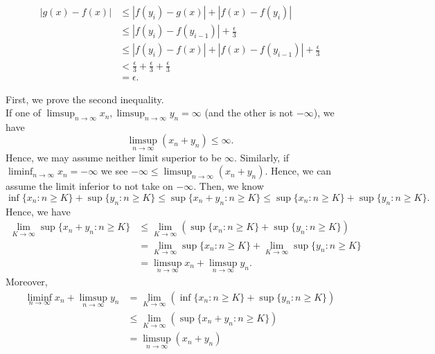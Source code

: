 \documentclass[a4paper]{article}
\begin{document}
\begin{solution}[18]
\begin{align*}
		\left| g\left( x \right) - f\left( x \right)  \right| &\le \left| f\left( y_{i} \right) - g\left( x \right)  \right|  + \left| f\left( x \right) - f\left( y_{i} \right)  \right| \\
								      &\le \left| f\left( y_{i} \right) - f\left( y_{i-1} \right)  \right|  + \frac{\epsilon}{3}\\
								      &\le \left| f\left( y_{i} \right) - f\left( x \right)  \right|  + \left| f\left( x \right) - f\left( y_{i-1} \right)  \right|  + \frac{\epsilon}{3}\\
								      &< \frac{\epsilon}{3} + \frac{\epsilon}{3} + \frac{\epsilon}{3}\\
								      &= \epsilon
	.\end{align*}
\end{solution}
\newpage
\begin{solution}[19]
	First, we prove the second inequality.	\\If one of \(\limsup_{n \to \infty} x_{n}, \limsup_{n \to \infty} y_{n} = \infty\) (and the other is not \(-\infty\)), we have \[
		\limsup_{n \to \infty} \left( x_{n} + y_{n} \right)  \le \infty
	.\]
	Hence, we may assume neither limit superior to be \(\infty\). Similarly, if \(\liminf_{n \to \infty} x_{n} = -\infty\) we see \(-\infty \le \limsup_{n \to \infty} \left( x_{n} + y_{n} \right) \). Hence, we can assume the limit inferior to not take on \(-\infty\).  Then, we know
	\[
	\inf \{ x_{n} : n \ge K\} +\sup \{ y_{n} : n\ge K \} \le \sup \{ x_{n} + y_{n} : n \ge K \} \le \sup \{ x_{n} : n\ge K \} + \sup \{ y_{n} : n\ge K \}
	.\]  Hence, we have
	\begin{align*}
		\lim_{K \to \infty}\sup \{ x_{n}  + y_{n}: n\ge K \} &\le \lim_{K \to \infty} \left( \sup \{ x_{n} : n\ge K  \}  + \sup \{ y_{n} :n \ge K  \}  \right) \\
								     &= \lim_{K \to \infty}\sup \{ x_{n} : n\ge K \} + \lim_{K \to \infty}\sup \{ y_{n} : n \ge K \} \\
								     &= \limsup_{n \to \infty} x_{n} + \limsup_{n \to \infty} y_{n}
	.\end{align*}
Moreover,
\begin{align*}
	\liminf_{n \to \infty} x_{n} + \limsup_{n \to \infty} y_{n} &= \lim_{K \to \infty}\left( \inf \{ x_{n} : n\ge K \} + \sup \{ y_{n} : n \ge K \}  \right)  \\
								    &\le \lim_{K \to \infty} \left( \sup \{ x_{n} + y_{n} : n \ge K \}  \right)\\
								    &= \limsup_{n \to \infty} (x_{n} + y_{n})

\end{align*}
\end{solution}
\end{document}
